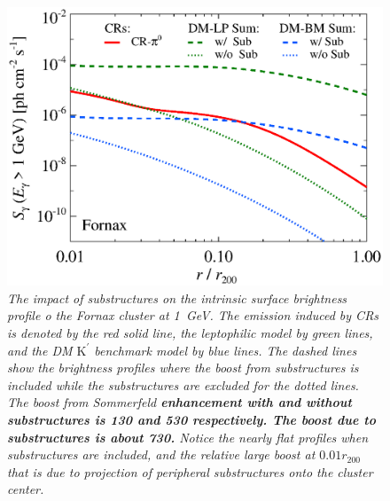 \documentclass[10pt,aps,pra,reprint,amsmath,amsfonts,amssymb,showpacs,nofootinbib,floatfix]{revtex4-1}
\def\C#1{{\bf #1}}
\newcommand{\rmn}{\mathrm}
\newcommand{\Kp}{\rmn{K}^\prime}
\newcommand{\rvir}{r_{200}}
\begin{document}
\begin{figure}%
 \includegraphics[width=0.99\columnwidth]{figures/SB.resolved.v13.1GeV.SF700.noSuB.vs.SubMass.elmu.eps}
 \caption{\it The impact of substructures on the intrinsic surface
   brightness profile o the Fornax cluster at 1~GeV. The emission
   induced by CRs is denoted by the red solid line, the leptophilic
   model by green lines, and the DM $\Kp$ benchmark model by blue
   lines. The dashed lines show the brightness profiles where the
   boost from substructures is included while the substructures are
   excluded for the dotted lines. The boost from Sommerfeld
   \C{enhancement with and without substructures is 130 and 530
     respectively. The boost due to substructures is
     about 730.} Notice the nearly flat profiles when substructures
   are included, and the relative large boost at $0.01\rvir$ that is
   due to projection of peripheral substructures onto the cluster
   center.}
 \label{fig:SB_sub}
\end{figure}
\end{document}
